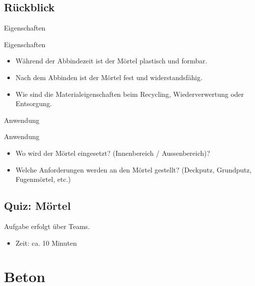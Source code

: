 \subsection{Rückblick}
\begin{frame}{Eigenschaften}
    \begin{block}{Eigenschaften}
        \begin{itemize}
            \item [\textbullet] Während der Abbindezeit ist der Mörtel plastisch und formbar.
            \item [\textbullet] Nach dem Abbinden ist der Mörtel fest und widerstandsfähig.
            \item [\textbullet] Wie sind die Materialeigenschaften beim Recycling, Wiederverwertung oder Entsorgung.
        \end{itemize}
    \end{block}

\end{frame}

\begin{frame}{Anwendung}
    \begin{block}{Anwendung}
        \begin{itemize}
            \item [\textbullet] Wo wird der Mörtel eingesetzt? (Innenbereich / Aussenbereich)?
            \item [\textbullet] Welche Anforderungen werden an den Mörtel gestellt? (Deckputz, Grundputz, Fugenmörtel, etc.)
        \end{itemize}
    \end{block}
\end{frame}

\subsection{Quiz: Mörtel}
\begin{frame}{Aufgabe erfolgt über Teams.}
    \begin{itemize}
        \item [\textbullet] Zeit: ca. 10 Minuten
    \end{itemize}

\end{frame}






\section{Beton}
\BlueSectionSlide

